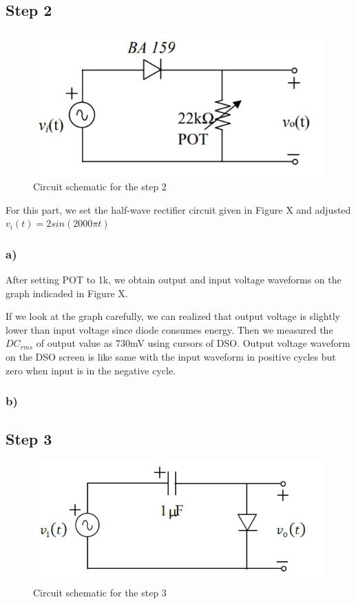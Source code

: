\documentclass[letterpaper,12pt]{article}
\begin{document}
\subsection{Step 2}

\begin{figure}[H]
    \centering
    \includegraphics[width=1\textwidth]{2_1.png}
    \caption{Circuit schematic for the step 2}
\end{figure} 
For this part, we set the half-wave rectifier circuit given in Figure X and adjusted 
\(
v_i(t)  = 2sin(2000 \pi t)  
\)


\subsubsection{a)}
After setting POT to 1k\Omega , we obtain output and input voltage waveforms on the graph indicaded in Figure X.


If we look at the graph carefully, we can realized that output voltage is slightly lower than input voltage since diode consumes energy. Then we measured the \(DC_{rms} \) of output value as 730mV using cursors of DSO. Output voltage waveform on the DSO screen is like same with the input waveform in positive cycles but zero when input is in the negative cycle.  


\subsubsection{b)}


\subsection{Step 3}

\begin{figure}[H]
    \centering
    \includegraphics[width=1\textwidth]{3_1.png}
    \caption{Circuit schematic for the step 3}
\end{figure} 
    
\end{document}
